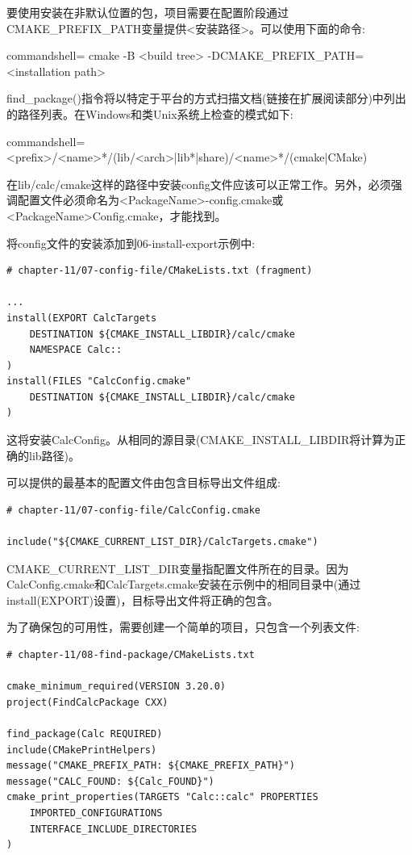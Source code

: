 要使用安装在非默认位置的包，项目需要在配置阶段通过CMAKE\_PREFIX\_PATH变量提供<安装路径>。可以使用下面的命令:

\begin{tcblisting}{commandshell={}}
cmake -B <build tree> -DCMAKE_PREFIX_PATH=<installation path>
\end{tcblisting}

find\_package()指令将以特定于平台的方式扫描文档(链接在扩展阅读部分)中列出的路径列表。在Windows和类Unix系统上检查的模式如下:

\begin{tcblisting}{commandshell={}}
<prefix>/<name>*/(lib/<arch>|lib*|share)/<name>*/(cmake|CMake)
\end{tcblisting}

在lib/calc/cmake这样的路径中安装config文件应该可以正常工作。另外，必须强调配置文件必须命名为<PackageName>-config.cmake或<PackageName>Config.cmake，才能找到。

将config文件的安装添加到06-install-export示例中:

\begin{lstlisting}[style=styleCMake]
# chapter-11/07-config-file/CMakeLists.txt (fragment)

...
install(EXPORT CalcTargets
	DESTINATION ${CMAKE_INSTALL_LIBDIR}/calc/cmake
	NAMESPACE Calc::
)
install(FILES "CalcConfig.cmake"
	DESTINATION ${CMAKE_INSTALL_LIBDIR}/calc/cmake
)
\end{lstlisting}

这将安装CalcConfig。从相同的源目录(CMAKE\_INSTALL\_LIBDIR将计算为正确的lib路径)。

可以提供的最基本的配置文件由包含目标导出文件组成:

\begin{lstlisting}[style=styleCMake]
# chapter-11/07-config-file/CalcConfig.cmake

include("${CMAKE_CURRENT_LIST_DIR}/CalcTargets.cmake")
\end{lstlisting}

CMAKE\_CURRENT\_LIST\_DIR变量指配置文件所在的目录。因为CalcConfig.cmake和CalcTargets.cmake安装在示例中的相同目录中(通过install(EXPORT)设置)，目标导出文件将正确的包含。

为了确保包的可用性，需要创建一个简单的项目，只包含一个列表文件:

\begin{lstlisting}[style=styleCMake]
# chapter-11/08-find-package/CMakeLists.txt

cmake_minimum_required(VERSION 3.20.0)
project(FindCalcPackage CXX)

find_package(Calc REQUIRED)
include(CMakePrintHelpers)
message("CMAKE_PREFIX_PATH: ${CMAKE_PREFIX_PATH}")
message("CALC_FOUND: ${Calc_FOUND}")
cmake_print_properties(TARGETS "Calc::calc" PROPERTIES
	IMPORTED_CONFIGURATIONS
	INTERFACE_INCLUDE_DIRECTORIES
)
\end{lstlisting}

